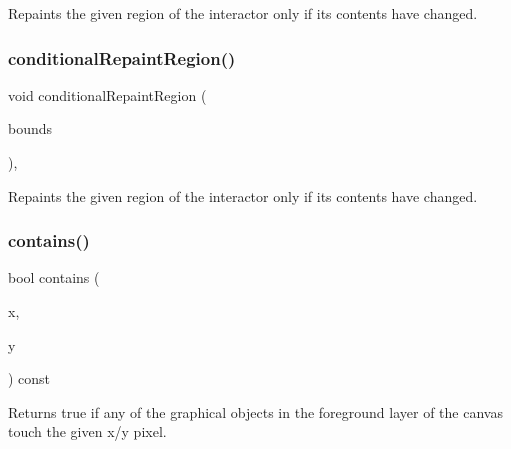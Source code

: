 Repaints the given region of the interactor only if its contents have changed. 

\mbox{\label{classGDrawingSurface_a3932a12278752db368e24fa404e446aa}} 
\subsubsection{\texorpdfstring{conditional\+Repaint\+Region()}{conditionalRepaintRegion()}\hspace{0.1cm}{\footnotesize\ttfamily [2/2]}}
{\footnotesize\ttfamily void conditional\+Repaint\+Region (\begin{DoxyParamCaption}\item[{const \mbox{\hyperlink{classGRectangle}{G\+Rectangle}} \&}]{bounds }\end{DoxyParamCaption})\hspace{0.3cm}{\ttfamily [virtual]}, {\ttfamily [inherited]}}



Repaints the given region of the interactor only if its contents have changed. 

\mbox{\label{classGCanvas_abb6a5d7c03e6eaaae97264c4799ce7c3}} 
\subsubsection{\texorpdfstring{contains()}{contains()}}
{\footnotesize\ttfamily bool contains (\begin{DoxyParamCaption}\item[{double}]{x,  }\item[{double}]{y }\end{DoxyParamCaption}) const\hspace{0.3cm}{\ttfamily [virtual]}}



Returns true if any of the graphical objects in the foreground layer of the canvas touch the given x/y pixel. 

\mbox{\label{classGCanvas_ad3d6147a5e08ed97bb71c7f267ef071b}} 
